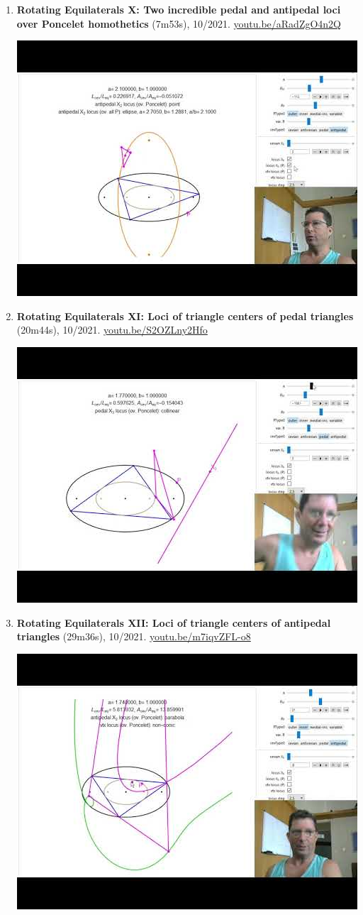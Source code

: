 \documentclass[12pt]{article}
\begin{document}
\begin{enumerate}[resume]
% 
\item \textbf{Rotating Equilaterals X: Two incredible pedal and antipedal loci over Poncelet homothetics} (7m53s), 10/2021. \href{https://youtu.be/aRadZgO4n2Q}{\url{youtu.be/aRadZgO4n2Q}}
\begin{center}\includegraphics[width=.5\textwidth]{pics/aRadZgO4n2Q.jpg}\end{center}
% 
\item \textbf{Rotating Equilaterals XI: Loci of triangle centers of pedal triangles} (20m44s), 10/2021. \href{https://youtu.be/S2OZLny2Hfo}{\url{youtu.be/S2OZLny2Hfo}}
\begin{center}\includegraphics[width=.5\textwidth]{pics/S2OZLny2Hfo.jpg}\end{center}
% 
\item \textbf{Rotating Equilaterals XII: Loci of triangle centers of antipedal triangles} (29m36s), 10/2021. \href{https://youtu.be/m7iqvZFL-o8}{\url{youtu.be/m7iqvZFL-o8}}
\begin{center}\includegraphics[width=.5\textwidth]{pics/m7iqvZFL-o8.jpg}\end{center}
% 
\end{enumerate}
\end{document}
